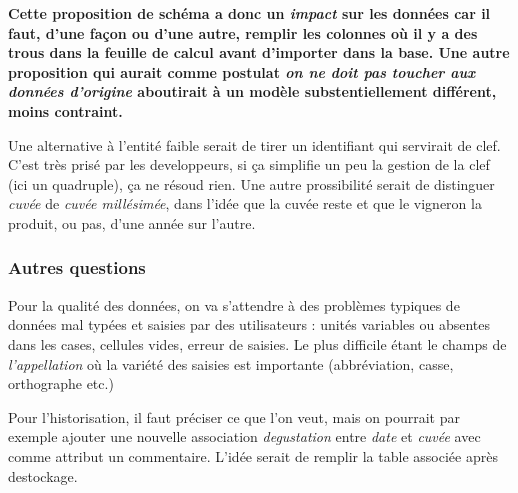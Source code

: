 \documentclass[11pt]{article}
\begin{document}
\textbf{Cette proposition de schéma a donc un \emph{impact} sur les
données car il faut, d'une façon ou d'une autre, remplir les colonnes où
il y a des trous dans la feuille de calcul avant d'importer dans la
base. Une autre proposition qui aurait comme postulat \emph{on ne doit
pas toucher aux données d'origine} aboutirait à un modèle
substentiellement différent, moins contraint.}

Une alternative à l'entité faible serait de tirer un identifiant qui
servirait de clef. C'est très prisé par les developpeurs, si ça
simplifie un peu la gestion de la clef (ici un quadruple), ça ne résoud
rien. Une autre prossibilité serait de distinguer \emph{cuvée} de
\emph{cuvée millésimée}, dans l'idée que la cuvée reste et que le
vigneron la produit, ou pas, d'une année sur l'autre.

\hypertarget{autres-questions}{%
\subsubsection{Autres questions}\label{autres-questions}}

Pour la qualité des données, on va s'attendre à des problèmes typiques
de données mal typées et saisies par des utilisateurs : unités variables
ou absentes dans les cases, cellules vides, erreur de saisies. Le plus
difficile étant le champs de \emph{l'appellation} où la variété des
saisies est importante (abbréviation, casse, orthographe etc.)

Pour l'historisation, il faut préciser ce que l'on veut, mais on
pourrait par exemple ajouter une nouvelle association \emph{degustation}
entre \emph{date} et \emph{cuvée} avec comme attribut un commentaire.
L'idée serait de remplir la table associée après destockage.


    
    
    
    
\end{document}
